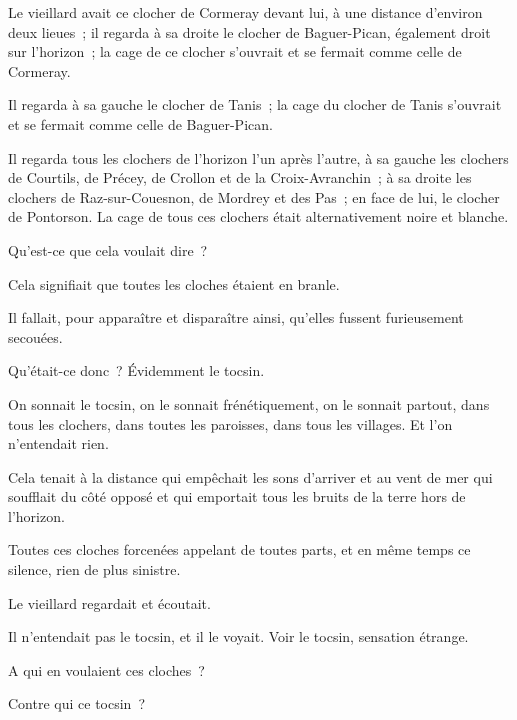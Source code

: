 \documentclass[french,twoside]{book} %
\begin{document}
Le vieillard avait ce clocher de Cormeray devant lui, à une distance d’environ deux lieues ; il regarda à sa droite le clocher de Baguer-Pican, également droit sur l’horizon ; la cage de ce clocher s’ouvrait et se fermait comme celle de Cormeray.\par
Il regarda à sa gauche le clocher de Tanis ; la cage  du clocher de Tanis s’ouvrait et se fermait comme celle de Baguer-Pican.\par
Il regarda tous les clochers de l’horizon l’un après l’autre, à sa gauche les clochers de Courtils, de Précey, de Crollon et de la Croix-Avranchin ; à sa droite les clochers de Raz-sur-Couesnon, de Mordrey et des Pas ; en face de lui, le clocher de Pontorson. La cage de tous ces clochers était alternativement noire et blanche.\par
Qu’est-ce que cela voulait dire ?\par
Cela signifiait que toutes les cloches étaient en branle.\par
Il fallait, pour apparaître et disparaître ainsi, qu’elles fussent furieusement secouées.\par
Qu’était-ce donc ? Évidemment le tocsin.\par
On sonnait le tocsin, on le sonnait frénétiquement, on le sonnait partout, dans tous les clochers, dans toutes les paroisses, dans tous les villages. Et l’on n’entendait rien.\par
Cela tenait à la distance qui empêchait les sons d’arriver et au vent de mer qui soufflait du côté opposé et qui emportait tous les bruits de la terre hors de l’horizon.\par
Toutes ces cloches forcenées appelant de toutes parts, et en même temps ce silence, rien de plus sinistre.\par
Le vieillard regardait et écoutait.\par
Il n’entendait pas le tocsin, et il le voyait. Voir le tocsin, sensation étrange.\par
A qui en voulaient ces cloches ?\par
Contre qui ce tocsin ?
\end{document}
